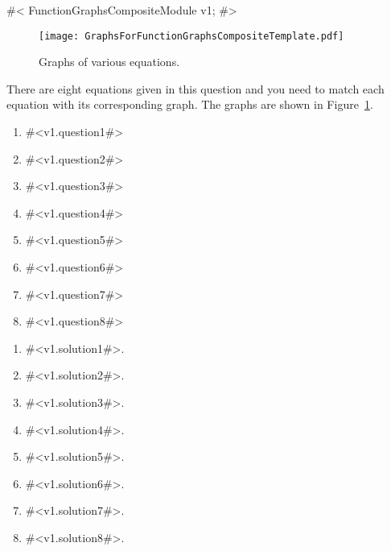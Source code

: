 


#<
FunctionGraphsCompositeModule v1;
#>



\begin{figure}[tbh]
\centerline{\texttt{[image: GraphsForFunctionGraphsCompositeTemplate.pdf]}}
 \caption{Graphs of various equations.}\label{Fi:GraphsForFunctionGraphsCompositeTemplate}
\end{figure}

There are eight equations given in this question and you need to match each equation with its corresponding graph. The 
graphs are shown in Figure~\ref{Fi:GraphsForFunctionGraphsCompositeTemplate}.
\begin{enumerate}
\item
#<v1.question1#> 
\item
#<v1.question2#> 
\item
#<v1.question3#> 
\item
#<v1.question4#> 
\item
#<v1.question5#>
\item
#<v1.question6#>
\item
#<v1.question7#>
\item
#<v1.question8#>

\end{enumerate}


\begin{enumerate}
\item
#<v1.solution1#>.\\
\item
#<v1.solution2#>.\\
\item
#<v1.solution3#>.\\
\item
#<v1.solution4#>.\\
\item
#<v1.solution5#>.\\
\item
#<v1.solution6#>.\\
\item
#<v1.solution7#>.\\
\item
#<v1.solution8#>. \\

\end{enumerate}

